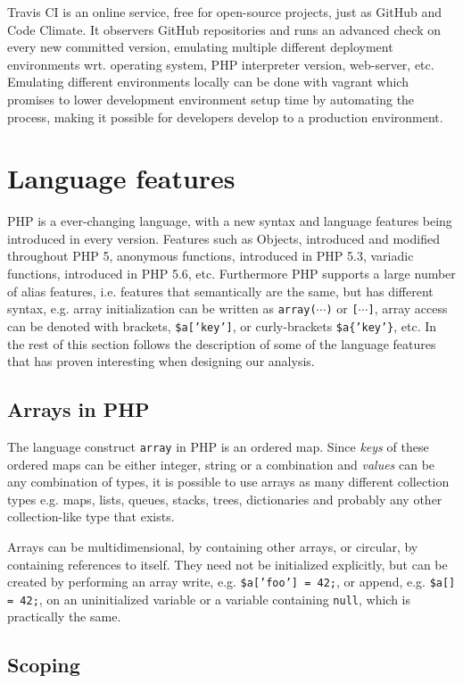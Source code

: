 Travis CI is an online service, free for open-source projects, just as GitHub and Code Climate. It observers GitHub repositories and runs an advanced check on every new committed version, emulating multiple different deployment environments wrt. operating system, PHP interpreter version, web-server, etc. Emulating different environments locally can be done with vagrant which promises to lower development environment setup time by automating the process, making it possible for developers develop to a production environment.


\section{Language features}
PHP is a ever-changing language, with a new syntax and language features being introduced in every version. Features such as Objects, introduced and modified throughout PHP 5, anonymous functions, introduced in PHP 5.3, variadic functions, introduced in PHP 5.6, etc. Furthermore PHP supports a large number of alias features, i.e. features that semantically are the same, but has different syntax, e.g. array initialization can be written as \texttt{array($\cdots$)} or \texttt{[$\cdots$]}, array access can be denoted with brackets, \texttt{\$a['key']}, or curly-brackets \texttt{\$a\{'key'\}}, etc. In the rest of this section follows the description of some of the language features that has proven interesting when designing our analysis.

\subsection{Arrays in PHP}
The language construct \texttt{array} in PHP is an ordered map. Since \emph{keys} of these ordered maps can be either integer, string or a combination and \emph{values} can be any combination of types, it is possible to use arrays as many different collection types e.g. maps, lists, queues, stacks, trees, dictionaries and probably any other collection-like type that exists. 

Arrays can be multidimensional, by containing other arrays, or circular, by containing references to itself. They need not be initialized explicitly, but can be created by performing an array write, e.g. \texttt{\$a['foo'] = 42;}, or append, e.g. \texttt{\$a[] = 42;}, on an uninitialized variable or a variable containing \texttt{null}, which is practically the same.

\subsection{Scoping}
\label{sec:backg_scoping}

